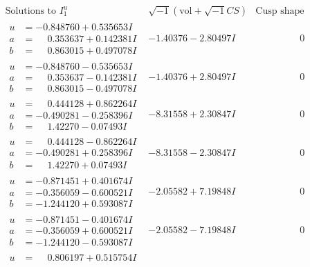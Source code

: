 \documentclass[1p]{elsarticle_modified}
\theoremstyle{definition}
\newcommand{\I}{\sqrt{-1}}
\begin{document}
$$\begin{array}{c|c|c}  
\text{Solutions to }I^u_{1}& \I (\text{vol} + \sqrt{-1}CS) & \text{Cusp shape}\\
 \hline 
\begin{aligned}
u &= -0.848760 + 0.535653 I \\
a &= \phantom{-}0.353637 + 0.142381 I \\
b &= \phantom{-}0.863015 + 0.497078 I\end{aligned}
 & -1.40376 - 2.80497 I & \phantom{-0.000000 } 0 \\ \hline\begin{aligned}
u &= -0.848760 - 0.535653 I \\
a &= \phantom{-}0.353637 - 0.142381 I \\
b &= \phantom{-}0.863015 - 0.497078 I\end{aligned}
 & -1.40376 + 2.80497 I & \phantom{-0.000000 } 0 \\ \hline\begin{aligned}
u &= \phantom{-}0.444128 + 0.862264 I \\
a &= -0.490281 - 0.258396 I \\
b &= \phantom{-}1.42270 - 0.07493 I\end{aligned}
 & -8.31558 + 2.30847 I & \phantom{-0.000000 } 0 \\ \hline\begin{aligned}
u &= \phantom{-}0.444128 - 0.862264 I \\
a &= -0.490281 + 0.258396 I \\
b &= \phantom{-}1.42270 + 0.07493 I\end{aligned}
 & -8.31558 - 2.30847 I & \phantom{-0.000000 } 0 \\ \hline\begin{aligned}
u &= -0.871451 + 0.401674 I \\
a &= -0.356059 - 0.600521 I \\
b &= -1.244120 + 0.593087 I\end{aligned}
 & -2.05582 + 7.19848 I & \phantom{-0.000000 } 0 \\ \hline\begin{aligned}
u &= -0.871451 - 0.401674 I \\
a &= -0.356059 + 0.600521 I \\
b &= -1.244120 - 0.593087 I\end{aligned}
 & -2.05582 - 7.19848 I & \phantom{-0.000000 } 0 \\ \hline\begin{aligned}
u &= \phantom{-}0.806197 + 0.515754 I \\

\end{aligned}
\end{array}$$
\end{document}
